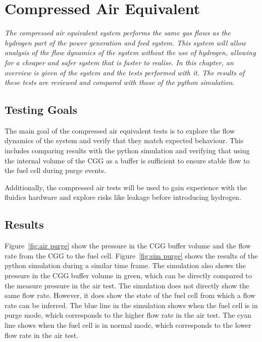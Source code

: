 
\section{Compressed Air Equivalent}%
\label{sec:air results}%

\emph{The compressed air equivalent system performs the same gas flows as the hydrogen part of the power generation and feed system. This system will allow analysis of the flow dynamics of the system without the use of hydrogen, allowing for a cheaper and safer system that is faster to realise. In this chapter, an overview is given of the system and the tests performed with it. The results of these tests are reviewed and compared with those of the python simulation.}

\subsection*{Testing Goals}
The main goal of the compressed air equivalent tests is to explore the flow dynamics of the system and verify that they match expected behaviour. This includes comparing results with the python simulation and verifying that using the internal volume of the CGG as a buffer is sufficient to ensure stable flow to the fuel cell during purge events.

Additionally, the compressed air tests will be used to gain experience with the fluidics hardware and explore risks like leakage before introducing hydrogen.




\subsection*{Results}
Figure~\ref{fig:air purge} show the pressure in the CGG buffer volume and the flow rate from the CGG to the fuel cell. Figure~\ref{fig:sim purge} shows the results of the python simulation during a similar time frame. The simulation also shows the pressure in the CGG buffer volume in green, which can be directly compared to the measure pressure in the air test. The simulation does not directly show the same flow rate. However, it does show the state of the fuel cell from which a flow rate can be inferred. The blue line in the simulation shows when the fuel cell is in purge mode, which corresponds to the higher flow rate in the air test. The cyan line shows when the fuel cell is in normal mode, which corresponds to the lower flow rate in the air test.

